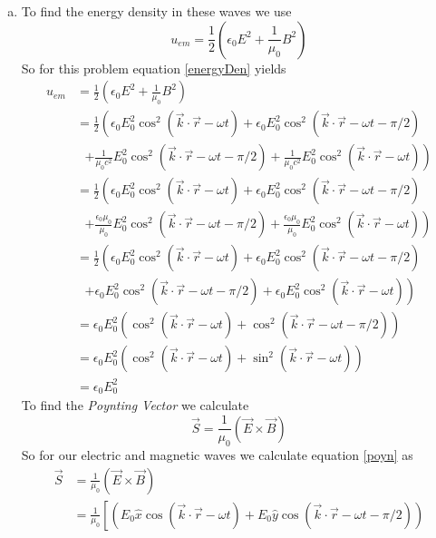 \documentclass[11pt]{article}
\numberwithin{equation}{section}
\begin{document}
\begin{enumerate}[(a)]
\item
To find the energy density in these waves we use
\begin{equation}
u_{em} = \frac{1}{2}\left(\epsilon_0 E^2+\frac{1}{\mu_0}B^2\right)
\label{energyDen}
\end{equation}
So for this problem equation \ref{energyDen} yields
\begin{align*}
u_{em} &= \frac{1}{2}\left(\epsilon_0 E^2+\frac{1}{\mu_0}B^2\right)\\
&= \frac{1}{2}\left(\epsilon_0E_0^2\cos^2(\vec{k}\cdot\vec{r}-\omega t) +\epsilon_0E_0^2\cos^2(\vec{k}\cdot\vec{r}-\omega t-\pi/2) \right.\\
&\ \ \ \left.+\frac{1}{\mu_0c^2}E_0^2\cos^2(\vec{k}\cdot\vec{r}-\omega t-\pi/2) + \frac{1}{\mu_0c^2}E_0^2\cos^2(\vec{k}\cdot\vec{r}-\omega t)\right)\\
&= \frac{1}{2}\left(\epsilon_0E_0^2\cos^2(\vec{k}\cdot\vec{r}-\omega t) +\epsilon_0E_0^2\cos^2(\vec{k}\cdot\vec{r}-\omega t-\pi/2) \right.\\
&\ \ \ \left.+\frac{\epsilon_0\mu_0}{\mu_0}E_0^2\cos^2(\vec{k}\cdot\vec{r}-\omega t-\pi/2) + \frac{\epsilon_0\mu_0}{\mu_0}E_0^2\cos^2(\vec{k}\cdot\vec{r}-\omega t)\right)\\
&= \frac{1}{2}\left(\epsilon_0E_0^2\cos^2(\vec{k}\cdot\vec{r}-\omega t) +\epsilon_0E_0^2\cos^2(\vec{k}\cdot\vec{r}-\omega t-\pi/2) \right.\\
&\ \ \ \left.+\epsilon_0E_0^2\cos^2(\vec{k}\cdot\vec{r}-\omega t-\pi/2) + \epsilon_0E_0^2\cos^2(\vec{k}\cdot\vec{r}-\omega t)\right)\\
&= \epsilon_0E_0^2\left(\cos^2(\vec{k}\cdot\vec{r}-\omega t) +\cos^2(\vec{k}\cdot\vec{r}-\omega t-\pi/2) \right)\\
&= \epsilon_0E_0^2\left(\cos^2(\vec{k}\cdot\vec{r}-\omega t) +\sin^2(\vec{k}\cdot\vec{r}-\omega t) \right)\\
&= \epsilon_0E_0^2
\end{align*}
To find the \emph{Poynting Vector} we calculate 
\begin{equation}
\vec{S} = \frac{1}{\mu_0}(\vec{E}\times\vec{B})
\label{poyn}
\end{equation}
So for our electric and magnetic waves we calculate equation \ref{poyn} as
\begin{align*}
\vec{S} &= \frac{1}{\mu_0}(\vec{E}\times\vec{B})\\
&= \frac{1}{\mu_0}\left[\left(E_0\hat{x}\cos(\vec{k}\cdot\vec{r}-\omega t) +E_0\hat{y}\cos(\vec{k}\cdot\vec{r}-\omega t-\pi/2)\right)\right.\\

\end{align*}
\end{enumerate}
\end{document}
